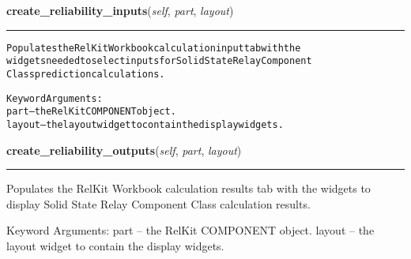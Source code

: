     \label{reliafree:relays:relay:SolidState:create_reliability_inputs}

    \vspace{0.5ex}

\hspace{.8\funcindent}\begin{boxedminipage}{\funcwidth}

    \raggedright \textbf{create\_reliability\_inputs}(\textit{self}, \textit{part}, \textit{layout})

    \vspace{-1.5ex}

    \rule{\textwidth}{0.5\fboxrule}
\setlength{\parskip}{2ex}
\begin{alltt}
Populates the RelKit Workbook calculation input tab with the
widgets needed to select inputs for Solid State Relay Component
Class prediction calculations.

Keyword Arguments:
  part -- the RelKit COMPONENT object.
layout -- the layout widget to contain the display widgets.
\end{alltt}

\setlength{\parskip}{1ex}
    \end{boxedminipage}

    \label{reliafree:relays:relay:SolidState:create_reliability_outputs}

    \vspace{0.5ex}

\hspace{.8\funcindent}\begin{boxedminipage}{\funcwidth}

    \raggedright \textbf{create\_reliability\_outputs}(\textit{self}, \textit{part}, \textit{layout})

    \vspace{-1.5ex}

    \rule{\textwidth}{0.5\fboxrule}
\setlength{\parskip}{2ex}
    Populates the RelKit Workbook calculation results tab with the 
    widgets to display Solid State Relay Component Class calculation 
    results.

    Keyword Arguments: part   -- the RelKit COMPONENT object. layout -- 
    the layout widget to contain the display widgets.

\setlength{\parskip}{1ex}
    \end{boxedminipage}

